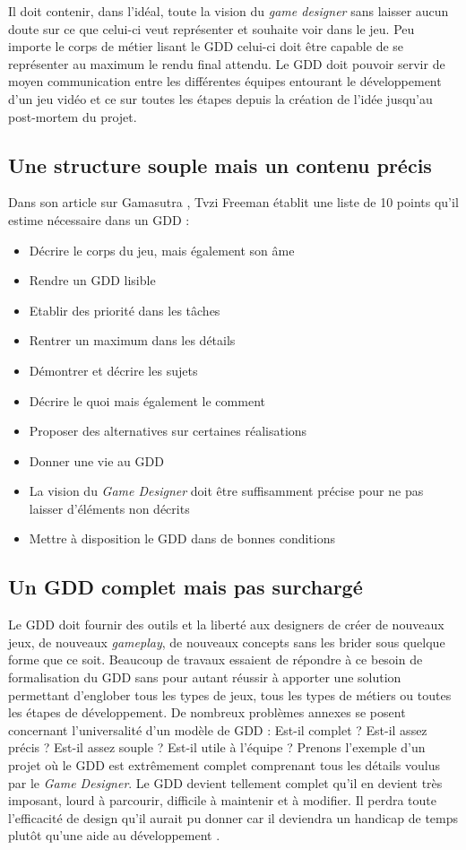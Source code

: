 Il doit contenir, dans l'idéal, toute la vision du \emph{game designer} sans laisser aucun doute sur ce que celui-ci veut représenter et souhaite voir dans le jeu. Peu importe le corps de métier lisant le GDD celui-ci doit être capable de se représenter au maximum le rendu final attendu. Le GDD doit pouvoir servir de moyen communication entre les différentes équipes entourant le développement d'un jeu vidéo et ce sur toutes les étapes depuis la création de l'idée jusqu'au post-mortem du projet.

\subsection{Une structure souple mais un contenu précis}
Dans son article sur Gamasutra \cite{gama_greateGDD}, Tvzi Freeman établit une liste de 10 points qu'il estime nécessaire dans un GDD :
\begin{itemize}
    \item Décrire le corps du jeu, mais également son âme
    \item Rendre un GDD lisible
    \item Etablir des priorité dans les tâches
    \item Rentrer un maximum dans les détails
    \item Démontrer et décrire les sujets
    \item Décrire le \guillemotleft quoi \guillemotright mais également le \guillemotleft comment \guillemotright
    \item Proposer des alternatives sur certaines réalisations
    \item Donner une vie au GDD
    \item La vision du  \emph{Game Designer} doit être suffisamment précise pour ne pas laisser d'éléments non décrits
    \item Mettre à disposition le GDD dans de bonnes conditions
\end{itemize}

\subsection{Un GDD complet mais pas surchargé}
Le GDD doit fournir des outils et la liberté aux designers de créer de nouveaux jeux, de nouveaux \emph{gameplay}, de nouveaux concepts sans les brider sous quelque forme que ce soit. Beaucoup de travaux essaient de répondre à ce besoin de formalisation du GDD \cite{GDD_software} \cite{multiview} \cite{GDD_GDProject} \cite{gama_greateGDD} sans pour autant réussir à apporter une solution permettant d'englober tous les types de jeux, tous les types de métiers ou toutes les étapes de développement. De nombreux problèmes annexes se posent concernant l'universalité d'un modèle de GDD : Est-il complet ? Est-il assez précis ? Est-il assez souple ? Est-il utile à l'équipe ? Prenons l'exemple d'un projet où le GDD est extrêmement complet comprenant tous les détails voulus par le \emph{Game Designer}. Le GDD devient tellement complet qu'il en devient très imposant, lourd à parcourir, difficile à maintenir et à modifier. Il perdra toute l'efficacité de design qu'il aurait pu donner car il deviendra un handicap de temps plutôt qu'une aide au développement \cite{onepage_librande}.


